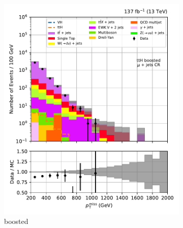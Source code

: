 \begin{figure}[htbp]
    \centering
    \begin{subfigure}[b]{0.24\textwidth}
        \includegraphics[width=\textwidth]{figures/region_plots/full_Run2/region_1/ttH_boosted.pdf}
        \caption{\ttH boosted}
    \end{subfigure}
    \hfill
    \begin{subfigure}[b]{0.24\textwidth}

\end{subfigure}
\end{figure}
